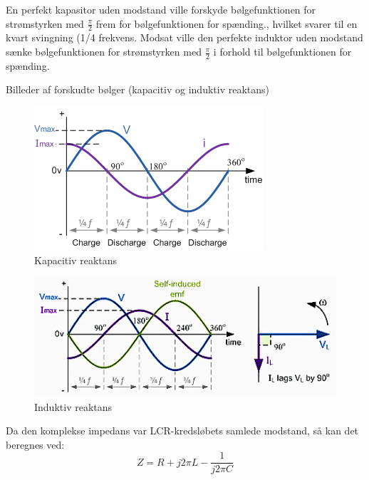 En perfekt kapasitor uden modstand ville forskyde bølgefunktionen for strømstyrken med $\frac{\pi}{2}$ frem for bølgefunktionen for spænding., hvilket svarer til en kvart svingning (1/4 frekvens. Modsat ville den perfekte induktor uden modstand sænke bølgefunktionen for strømstyrken med $\frac{\pi}{2}$ i forhold til bølgefunktionen for spænding.

Billeder af forskudte bølger (kapacitiv og induktiv reaktans)
\begin{figure}[H]
\centering
\includegraphics[scale=1]{Vildledning/Schematics/Kapacitiv_reaktans}
\caption{Kapacitiv reaktans}
\label{kreaktans}
\end{figure}

\begin{figure}[H]
\centering
\includegraphics[scale=0.8]{Vildledning/Schematics/Induktiv_reaktans}
\caption{Induktiv reaktans}
\label{ireaktans}
\end{figure}

Da den komplekse impedans var LCR-kredsløbets samlede modstand, så kan det beregnes ved:
\begin{equation}
Z = R + j 2 \pi L - \frac{1}{j 2 \pi C}
\end{equation}
\newpage